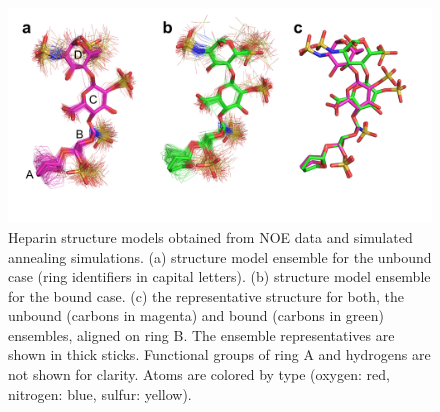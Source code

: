 \begin{figure}
\centering
\includegraphics[width=\textwidth]{gfx/nmr/Figure_07_bound_vs_free_three_panels_05.png}
\caption[]{
Heparin structure models obtained from NOE data and simulated annealing
simulations. (a) structure model ensemble for the unbound case (ring identifiers
in capital letters). (b) structure model ensemble for the bound case. (c) the
representative structure for both, the unbound (carbons in magenta) and bound
(carbons in green) ensembles, aligned on ring B. The ensemble representatives
are shown in thick sticks. Functional groups of ring A and hydrogens are not
shown for clarity. Atoms are colored by type (oxygen: red, nitrogen: blue,
sulfur: yellow).
}
\label{fig:nmr:hp_ensembles_representatives}
\end{figure}

